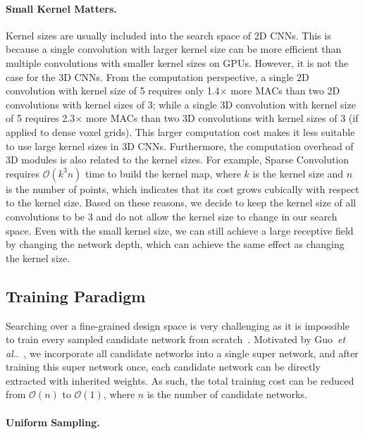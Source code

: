 \documentclass[runningheads]{llncs}
\makeatletter
\DeclareRobustCommand\onedot{\futurelet\@let@token\@onedot}
\def\@onedot{\ifx\@let@token.\else.\null\fi\xspace}
\def\etal{\emph{et al}\onedot}
\makeatother
\begin{document}
\paragraph{Small Kernel Matters.}

Kernel sizes are usually included into the search space of 2D CNNs. This is because a single convolution with larger kernel size can be more efficient than multiple convolutions with smaller kernel sizes on GPUs. However, it is not the case for the 3D CNNs. From the computation perspective, a single 2D convolution with kernel size of 5 requires only 1.4$\times$ more MACs than two 2D convolutions with kernel sizes of 3; while a single 3D convolution with kernel size of 5 requires 2.3$\times$ more MACs than two 3D convolutions with kernel sizes of 3 (if applied to dense voxel grids). This larger computation cost makes it less suitable to use large kernel sizes in 3D CNNs. Furthermore, the computation overhead of 3D modules is also related to the kernel sizes. For example, Sparse Convolution~\cite{graham20183d,choy20194d} requires $\mathcal{O}(k^3n)$ time to build the kernel map, where $k$ is the kernel size and $n$ is the number of points, which indicates that its cost grows cubically with respect to the kernel size. Based on these reasons, we decide to keep the kernel size of all convolutions to be 3 and do not allow the kernel size to change in our search space. Even with the small kernel size, we can still achieve a large receptive field by changing the network depth, which can achieve the same effect as changing the kernel size.

\subsection{Training Paradigm}

Searching over a fine-grained design space is very challenging as it is impossible to train every sampled candidate network from scratch~\cite{tan2019mnasnet}. Motivated by Guo~\etal~\cite{guo2019single}, we incorporate all candidate networks into a single super network, and after training this super network once, each candidate network can be directly extracted with inherited weights. As such, the total training cost can be reduced from $\mathcal{O}(n)$ to $\mathcal{O}(1)$, where $n$ is the number of candidate networks.

\paragraph{Uniform Sampling.}
\end{document}
